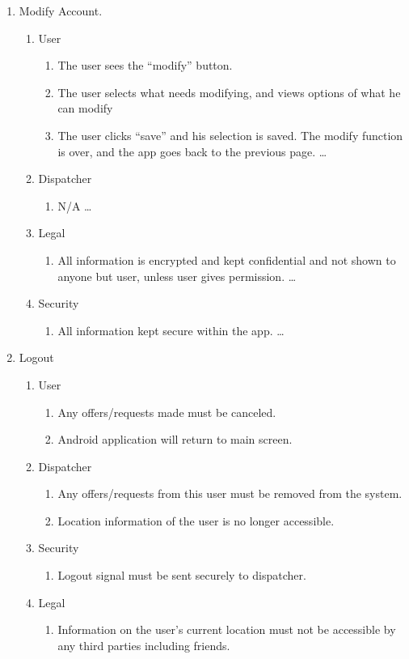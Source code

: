 \documentclass[english]{article}
\begin{document}
\begin{enumerate}[{BE}1.]
	\item Modify Account.	
	\begin{enumerate}[{VP2}.1]
		\item User
			\begin{enumerate}
				\item The user sees the “modify” button.
				\item The user selects what needs modifying, and views options of what he can modify
				\item
				The user clicks “save” and his selection is saved. The modify function is over, and the app goes back to the previous page. \dots
			\end{enumerate}
		\item Dispatcher
			\begin{enumerate}
				\item N/A
				 \dots
			\end{enumerate}
		\item Legal
			\begin{enumerate}
				\item All information is encrypted and kept confidential and not shown to anyone but user, unless user gives permission. \dots
			\end{enumerate}
			\item Security
			\begin{enumerate}
				\item All information kept secure within the app. \dots
			\end{enumerate}
	\end{enumerate}
	
	\item Logout
	\begin{enumerate}[{VP2}.1]
		\item User
			\begin{enumerate}
				\item Any offers/requests made must be canceled.
				\item Android application will return to main screen.
			\end{enumerate}
		\item Dispatcher
			\begin{enumerate}
				\item Any offers/requests from this user must be removed from the system.
				\item Location information of the user is no longer accessible.
			\end{enumerate}
		\item Security
			\begin{enumerate}
				\item Logout signal must be sent securely to dispatcher.
			\end{enumerate}
		\item Legal
			\begin{enumerate}
				\item Information on the user's current location must not be accessible by any third
				parties including friends.
			\end{enumerate}
	\end{enumerate}
	

\end{enumerate}
\end{document}
